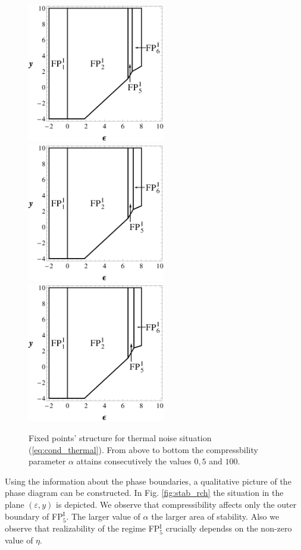 \documentclass[aps,pre,url,twocolumn,superscriptaddress]{revtex4-1}
\def\eps{\varepsilon}
\newcommand{\fp}[2]{FP$^{\textrm{#1}}_{#2}$}
\begin{document}
\begin{figure}[h!]
  \includegraphics[width=6cm]{RCHM_2a.eps}
  \includegraphics[width=6cm]{RCHM_2b.eps}
  \includegraphics[width=6cm]{RCHM_2c.eps}
  \caption{Fixed points' structure for thermal noise situation 
	(\ref{eq:cond_thermal}). 
	From above to bottom the compressbility parameter $\alpha$ attains
	consecutively the values $0,5$ and $100$.
	}
  \label{fig:thermal}	
\end{figure}

Using the information about the phase boundaries, a qualitative picture of the phase diagram
can be constructed. In Fig. \ref{fig:stab_rch} the situation in the plane $(\eps,y)$ is depicted.
We observe that compressibility affects 
 only the outer boundary of \fp{I}{5}. The larger value of $\alpha$ the larger area
of stability. Also we observe that  realizability of the regime \fp{I}{5} 
crucially dependss on the non-zero value of $\eta$.
\end{document}
